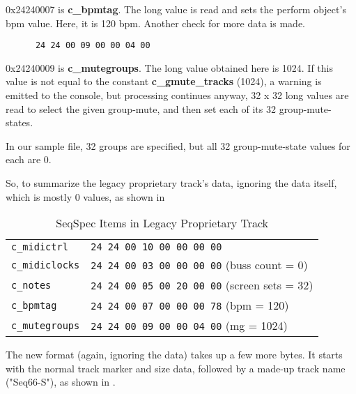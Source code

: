    0x24240007 is \textbf{c\_bpmtag}.  The long value is read and sets the
   perform object's bpm value.  Here, it is 120 bpm.
   Another check for more data is made.

   \begin{verbatim}
      24 24 00 09 00 00 04 00
   \end{verbatim}

   0x24240009 is \textbf{c\_mutegroups}.  The long value obtained here is
   1024.  If this value is not equal to the constant
   \textbf{c\_gmute\_tracks} (1024), a warning is emitted to the console,
   but processing continues anyway, 32 x 32 long values are read to select
   the given group-mute, and then set each of its 32 group-mute-states.

   In our sample file, 32 groups are specified, but all 32 group-mute-state
   values for each are 0.

   So, to summarize the legacy proprietary track's data, ignoring the data
   itself, which is mostly 0 values, as shown in

   \begin{table}[htb]
      \centering
      \caption{SeqSpec Items in Legacy Proprietary Track}
      \label{table:seqspec_items_legacy_track}
      \begin{tabular}{l l}
\texttt{c\_midictrl}    & \texttt{24 24 00 10 00 00 00 00} \\
\texttt{c\_midiclocks}  & \texttt{24 24 00 03 00 00 00 00} (buss count = 0) \\
\texttt{c\_notes}       & \texttt{24 24 00 05 00 20 00 00} (screen sets = 32) \\
\texttt{c\_bpmtag}      & \texttt{24 24 00 07 00 00 00 78} (bpm = 120) \\
\texttt{c\_mutegroups}  & \texttt{24 24 00 09 00 00 04 00} (mg = 1024) \\
      \end{tabular}
   \end{table}

   The new format (again, ignoring the data) takes up a few more bytes.
   It starts with the normal track marker and size data, followed by a
   made-up track name ("Seq66-S"),
   as shown in .

